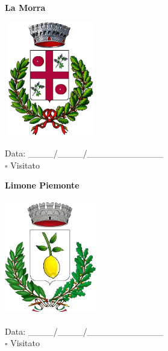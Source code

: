 \documentclass[a5paper,12pt]{article}
\begin{document}
\newpage

\noindent
\begin{minipage}[t]{0.45\textwidth}
    \begin{center}
        \textbf{La Morra}
    \end{center}
    \vspace{-0.5cm} %
    \begin{center}
        \includegraphics[height= 5cm, width=4cm]{Piemonte/Stemma La Morra.png}
    \end{center}
    \vspace{-0.4cm} %
    \begin{flushleft}
        Data: \_\_\_\_/\_\_\_\_/\_\_\_\_\_\_\_\_\_\_\_\_ \\
        $\square$ Visitato
    \end{flushleft}
\end{minipage}
\hfill
\noindent
\begin{minipage}[t]{0.45\textwidth}
    \begin{center}
        \textbf{Limone Piemonte}
    \end{center}
    \vspace{-0.5cm} %
    \begin{center}
        \includegraphics[height= 5cm, width=4cm]{Piemonte/Stemma Limone Piemonte.png}
    \end{center}
    \vspace{-0.4cm} %
    \begin{flushleft}
        Data: \_\_\_\_/\_\_\_\_/\_\_\_\_\_\_\_\_\_\_\_\_ \\
        $\square$ Visitato
    \end{flushleft}
\end{minipage}
\end{document}
